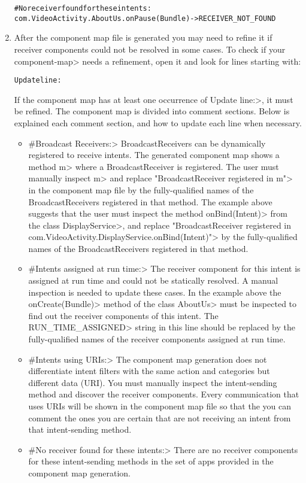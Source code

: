 \begin{enumerate}
\begin{alltt}
#No receiver found for these intents:
com.VideoActivity.AboutUs.onPause(Bundle) -> RECEIVER_NOT_FOUND
\end{alltt}

\bigskip

\item
After the component map file is generated you may need to refine it if
receiver components could not be resolved in some cases. To check if your
\<component-map> needs a refinement, open it and look for lines starting with:

\begin{alltt}
Update line:
\end{alltt}
\bigskip
If the component map has at
least one occurrence of \<Update line:>, it must be refined.
The component map is divided into comment sections. Below is
explained each comment section, and how to update each line when necessary.

\begin{itemize}
\item
\<\#Broadcast Receivers:> BroadcastReceivers can be dynamically registered to
receive intents. The generated component map shows a method \<m> where a
BroadcastReceiver is registered. The user must manually inspect \<m> and replace
\<"BroadcastReceiver registered in m"> in the component map file by the
fully-qualified names of the BroadcastReceivers
registered in that method. The example above suggests that the user must inspect
the method \<onBind(Intent)> from the class \<DisplayService>, and replace
\<"BroadcastReceiver registered in
com.VideoActivity.DisplayService.onBind(Intent)"> by the fully-qualified names of
the BroadcastReceivers registered in that method.

\item
\<\#Intents assigned at run time:> The receiver component for this intent is
assigned at run time and could not be statically resolved. A manual inspection
is needed to update these cases. In the example above the \<onCreate(Bundle)>
method of the class \<AboutUs> must be inspected to find out the receiver
components of this intent. The \<RUN\_TIME\_ASSIGNED> string in this line
should be replaced by the fully-qualified names of the receiver components
assigned at run time.

\item
\<\#Intents using URIs:> The component map generation does not differentiate
intent filters with the same action and categories but different data (URI).
You must manually inspect the intent-sending method and discover the receiver
components. Every communication that uses URIs will be shown in the component
map file so that the you can comment the ones you are certain that are not
receiving an intent from that intent-sending method.

\item
\<\#No receiver found for these intents:> There are no receiver components for
these intent-sending methods in the set of apps provided in the component map
generation.
\end{itemize}
\end{enumerate}


